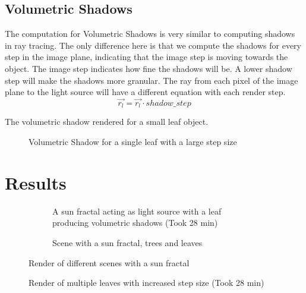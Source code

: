 \documentclass[paper=a4, fontsize=11pt]{scrartcl}
\numberwithin{equation}{section}		%
\numberwithin{figure}{section}			%
\numberwithin{table}{section}				%
\begin{document}
\newpage
\subsection{Volumetric Shadows}
The computation for Volumetric Shadows is very similar to computing shadows in ray tracing. The only difference here is that we compute the shadows for every step in the image plane, indicating that the image step is moving towards the object.
The image step indicates how fine the shadows will be. A lower shadow step will make the shadows more granular.
The ray from each pixel of the image plane to the light source will have a different equation with each render step.\
\[ \overrightarrow{r_{l}} = \overrightarrow{r_{l}} \cdot shadow\_step \]
\par The volumetric shadow rendered for a small leaf object.
\vspace{20pt}
\begin{figure}[h]
\centering
{}
\caption{Volumetric Shadow for a single leaf with a large step size}
\end{figure}

\newpage
\section{Results}

\vspace{20pt}
\begin{figure}[h]
\centering
\begin{subfigure}{0.5\textwidth}
\centering
{}
\caption{A sun fractal acting as light source with a leaf producing volumetric shadows  (Took 28 min)}
\end{subfigure}%
\begin{subfigure}{0.5\textwidth}
\centering
{}
\caption{Scene with a sun fractal, trees and leaves}
\end{subfigure}
\caption{Render of different scenes with a sun fractal}
\end{figure}

\vspace{20pt}
\begin{figure}[h]
\centering
{}
\caption{Render of multiple leaves with increased step size (Took 28 min)}
\end{figure}

\newpage
\end{document}
